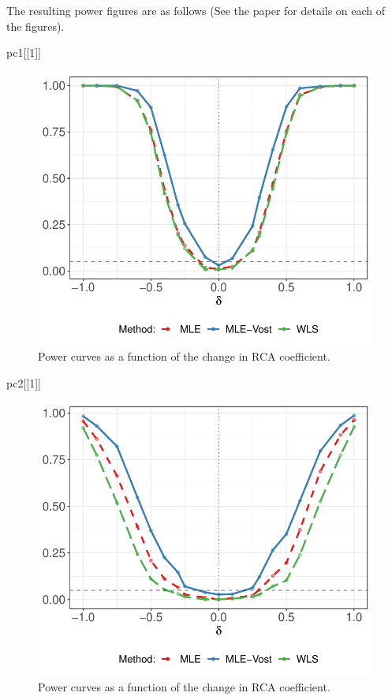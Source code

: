 \documentclass[
]{article}
\newenvironment{Shaded}{\begin{snugshade}}{\end{snugshade}}
\newcommand{\DecValTok}[1]{\textcolor[rgb]{0.00,0.00,0.81}{#1}}
\newcommand{\NormalTok}[1]{#1}
\begin{document}
The resulting power figures are as follows (See the paper for details on
each of the figures).

\begin{Shaded}
\begin{Highlighting}[]
\NormalTok{pc1[[}\DecValTok{1}\NormalTok{]]}
\end{Highlighting}
\end{Shaded}

\begin{figure}
\centering
\includegraphics{paperCode_files/figure-latex/plotPowerCurves-1.pdf}
\caption{Power curves as a function of the change in RCA coefficient.}
\end{figure}

\begin{Shaded}
\begin{Highlighting}[]
\NormalTok{pc2[[}\DecValTok{1}\NormalTok{]]}
\end{Highlighting}
\end{Shaded}

\begin{figure}
\centering
\includegraphics{paperCode_files/figure-latex/plotPowerCurves-2.pdf}
\caption{Power curves as a function of the change in RCA coefficient.}
\end{figure}
\end{document}
